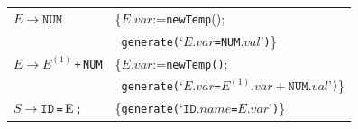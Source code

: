 \documentclass[dvipdfmx]{jarticle}
\newcommand{\ttlp}{{\tt (}}
\newcommand{\ttrp}{{\tt )}}
\newcommand{\tteq}{{\tt =}}
\newcommand{\newTempnull}{{\tt newTemp}}
\newcommand{\genassign}[2]{{\tt generate}\ttlp`{#1}\tteq{#2}'\ttrp}
\begin{document}
\begin{tabular}{ll}
  $E\rightarrow\texttt{NUM}$ & \{$E.var$:=\newTempnull();\\
  & \ \genassign{$E.var$}{\texttt{NUM}$.val$}\}\\
  $E\rightarrow E^{(1)}$\,\texttt{+}\,\texttt{NUM}
  & \{{$E.var$:=\texttt{newTemp()};}\\
  & \ \genassign{$E.var$}{$E^{(1)}.var+\texttt{NUM}.val$}\}\\
  $S\rightarrow\texttt{ID}$\,\texttt{=}\,E\,\texttt{;}
  & \{\genassign{$\texttt{ID}.name$}{$E.var$}\}
\end{tabular}
\end{document}
